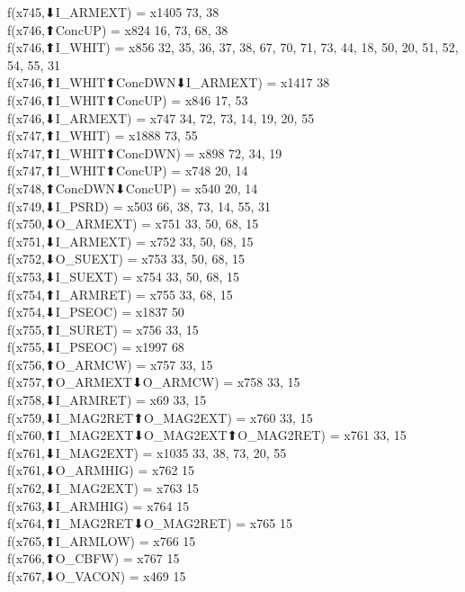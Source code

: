 f(x745,⬇I_ARMEXT) = x1405 {73, 38} \\
f(x746,⬆ConcUP) = x824 {16, 73, 68, 38} \\
f(x746,⬆I_WHIT) = x856 {32, 35, 36, 37, 38, 67, 70, 71, 73, 44, 18, 50, 20, 51, 52, 54, 55, 31} \\
f(x746,⬆I_WHIT⬆ConcDWN⬇I_ARMEXT) = x1417 {38} \\
f(x746,⬆I_WHIT⬆ConcUP) = x846 {17, 53} \\
f(x746,⬇I_ARMEXT) = x747 {34, 72, 73, 14, 19, 20, 55} \\
f(x747,⬆I_WHIT) = x1888 {73, 55} \\
f(x747,⬆I_WHIT⬆ConcDWN) = x898 {72, 34, 19} \\
f(x747,⬆I_WHIT⬆ConcUP) = x748 {20, 14} \\
f(x748,⬆ConcDWN⬇ConcUP) = x540 {20, 14} \\
f(x749,⬇I_PSRD) = x503 {66, 38, 73, 14, 55, 31} \\
f(x750,⬇O_ARMEXT) = x751 {33, 50, 68, 15} \\
f(x751,⬇I_ARMEXT) = x752 {33, 50, 68, 15} \\
f(x752,⬇O_SUEXT) = x753 {33, 50, 68, 15} \\
f(x753,⬇I_SUEXT) = x754 {33, 50, 68, 15} \\
f(x754,⬆I_ARMRET) = x755 {33, 68, 15} \\
f(x754,⬇I_PSEOC) = x1837 {50} \\
f(x755,⬆I_SURET) = x756 {33, 15} \\
f(x755,⬇I_PSEOC) = x1997 {68} \\
f(x756,⬆O_ARMCW) = x757 {33, 15} \\
f(x757,⬆O_ARMEXT⬇O_ARMCW) = x758 {33, 15} \\
f(x758,⬇I_ARMRET) = x69 {33, 15} \\
f(x759,⬇I_MAG2RET⬆O_MAG2EXT) = x760 {33, 15} \\
f(x760,⬆I_MAG2EXT⬇O_MAG2EXT⬆O_MAG2RET) = x761 {33, 15} \\
f(x761,⬇I_MAG2EXT) = x1035 {33, 38, 73, 20, 55} \\
f(x761,⬇O_ARMHIG) = x762 {15} \\
f(x762,⬇I_MAG2EXT) = x763 {15} \\
f(x763,⬇I_ARMHIG) = x764 {15} \\
f(x764,⬆I_MAG2RET⬇O_MAG2RET) = x765 {15} \\
f(x765,⬆I_ARMLOW) = x766 {15} \\
f(x766,⬆O_CBFW) = x767 {15} \\
f(x767,⬇O_VACON) = x469 {15} \\
